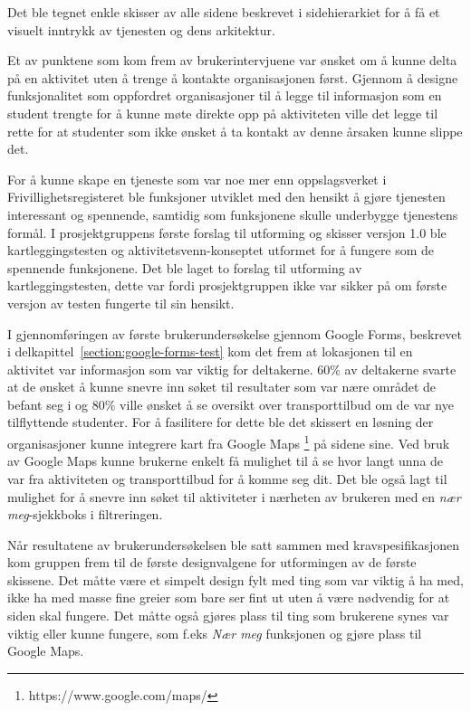 Det ble tegnet enkle skisser av alle sidene beskrevet i sidehierarkiet for å få et visuelt inntrykk av tjenesten og dens arkitektur.

Et av punktene som kom frem av brukerintervjuene var ønsket om å kunne delta på en aktivitet uten å trenge å kontakte organisasjonen først. Gjennom å designe funksjonalitet som oppfordret organisasjoner til å legge til informasjon som en student trengte for å kunne møte direkte opp på aktiviteten ville det legge til rette for at studenter som ikke ønsket å ta kontakt av denne årsaken kunne slippe det.

For å kunne skape en tjeneste som var noe mer enn oppslagsverket i Frivillighetsregisteret ble funksjoner utviklet med den hensikt å gjøre tjenesten interessant og spennende, samtidig som funksjonene skulle underbygge tjenestens formål. I prosjektgruppens første forslag til utforming og skisser versjon 1.0 ble kartleggingstesten og aktivitetsvenn-konseptet utformet for å fungere som de spennende funksjonene. Det ble laget to forslag til utforming av kartleggingstesten, dette var fordi prosjektgruppen ikke var sikker på om første versjon av testen fungerte til sin hensikt.

I gjennomføringen av første brukerundersøkelse gjennom Google Forms, beskrevet i delkapittel~\ref{section:google-forms-test} kom det frem at lokasjonen til en aktivitet var informasjon som var viktig for deltakerne. 60\% av deltakerne svarte at de ønsket å kunne snevre inn søket til resultater som var nære området de befant seg i og 80\% ville ønsket å se oversikt over transporttilbud om de var nye tilflyttende studenter. For å fasilitere for dette ble det skissert en løsning der organisasjoner kunne integrere kart fra Google Maps \footnote{https://www.google.com/maps/} på sidene sine. Ved bruk av Google Maps kunne brukerne enkelt få mulighet til å se hvor langt unna de var fra aktiviteten og transporttilbud for å komme seg dit. Det ble også lagt til mulighet for å snevre inn søket til aktiviteter i nærheten av brukeren med en {\em  nær meg}-sjekkboks i filtreringen.

Når resultatene av brukerundersøkelsen ble satt sammen med kravspesifikasjonen kom gruppen frem til de første designvalgene for utformingen av de første skissene.
Det måtte være et simpelt design fylt med ting som var viktig å ha med, ikke ha med masse fine greier som bare ser fint ut uten å være nødvendig for at siden skal fungere. Det måtte også gjøres plass til ting som brukerene synes var viktig eller kunne fungere, som f.eks {\em Nær meg} funksjonen og gjøre plass til Google Maps.

